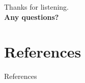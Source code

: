 \documentclass[aspectratio=43,t]{beamer}
\begin{document}

  { %
    \begin{frame}[c,noframenumbering]
      \begin{center}
        Thanks for listening.\\
        {\bf Any questions?}
      \end{center}
    \end{frame}

    \section*{References}
    \begin{frame}{References}
      \printbibliography
    \end{frame}
  }
\end{document}
